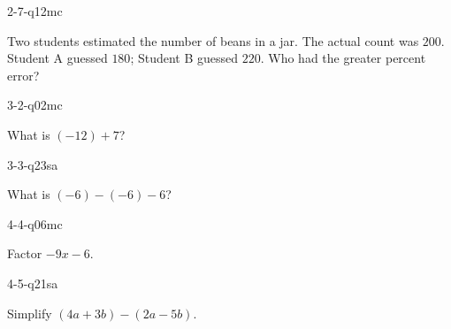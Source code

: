 \begin{practiceQuestion}{2-7-q12}{mc}
\begin{questionText}
Two students estimated the number of beans in a jar. The actual count was $200$. Student A guessed $180$; Student B guessed $220$. Who had the greater percent error?
\end{questionText}
\end{practiceQuestion}

\begin{practiceQuestion}{3-2-q02}{mc}
\begin{questionText}
What is $(-12) + 7$?
\end{questionText}
\end{practiceQuestion}

\begin{practiceQuestion}{3-3-q23}{sa}
\begin{questionText}
What is $(-6) - (-6) - 6$?
\end{questionText}
\end{practiceQuestion}

\begin{practiceQuestion}{4-4-q06}{mc}
\begin{questionText}
Factor $-9x - 6$.
\end{questionText}
\end{practiceQuestion}

\begin{practiceQuestion}{4-5-q21}{sa}
\begin{questionText}
Simplify $(4a + 3b) - (2a - 5b)$.
\end{questionText}
\end{practiceQuestion}

